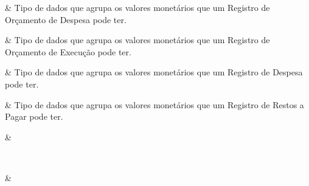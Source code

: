  &
Tipo de dados que agrupa os valores monetários que um Registro de Orçamento de Despesa pode ter. 
\\ \hline

 &
Tipo de dados que agrupa os valores monetários que um Registro de Orçamento de Execução pode ter. 
\\ \hline

 &
Tipo de dados que agrupa os valores monetários que um Registro de Despesa pode ter. 
\\ \hline

 &
Tipo de dados que agrupa os valores monetários que um Registro de Restos a Pagar pode ter. 
\\ \hline

\seqsplit{} &
 
\\ \hline

\seqsplit{} &
 
\\ \hline
